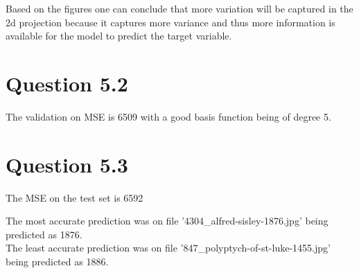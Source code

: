 \documentclass{article}
\begin{document}
\noindent Based on the figures one can conclude that more variation will be captured in the
2d projection because it captures more variance and thus more information is available
for the model to predict the target variable.

\section*{Question 5.2}
The validation on MSE is 6509 with a good basis function being of degree 5.

\section*{Question 5.3}
The MSE on the test set is 6592

\noindent The most accurate prediction was on file '4304\_alfred-sisley-1876.jpg' being predicted as 1876.\\
The least accurate prediction was on file '847\_polyptych-of-st-luke-1455.jpg' being predicted as 1886.
\end{document}
